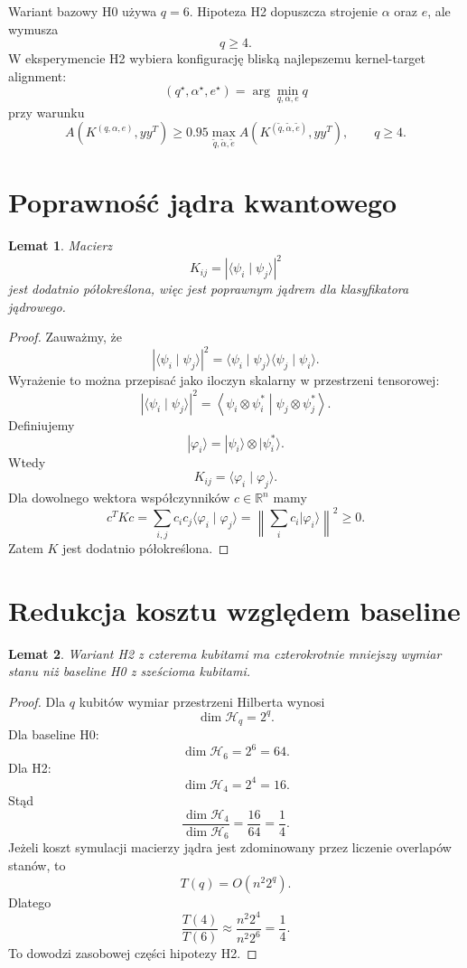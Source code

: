 \documentclass[11pt,a4paper]{article}
\newtheorem{lemma}{Lemat}
\begin{document}
Wariant bazowy H0 używa $q=6$. Hipoteza H2 dopuszcza strojenie $\alpha$ oraz $e$, ale wymusza
\[
q \ge 4.
\]
W eksperymencie H2 wybiera konfigurację bliską najlepszemu kernel-target alignment:
\[
(q^\star,\alpha^\star,e^\star)
=
\arg\min_{q,\alpha,e} q
\]
przy warunku
\[
A\!\left(K^{(q,\alpha,e)}, yy^T\right)
\ge
0.95
\max_{\tilde q,\tilde\alpha,\tilde e}
A\!\left(K^{(\tilde q,\tilde\alpha,\tilde e)}, yy^T\right),
\qquad q\ge 4.
\]

\section{Poprawność jądra kwantowego}

\begin{lemma}
Macierz
\[
K_{ij}=\left|\langle\psi_i\mid\psi_j\rangle\right|^2
\]
jest dodatnio półokreślona, więc jest poprawnym jądrem dla klasyfikatora jądrowego.
\end{lemma}

\begin{proof}
Zauważmy, że
\[
\left|\langle\psi_i\mid\psi_j\rangle\right|^2
=
\langle\psi_i\mid\psi_j\rangle
\langle\psi_j\mid\psi_i\rangle.
\]
Wyrażenie to można przepisać jako iloczyn skalarny w przestrzeni tensorowej:
\[
\left|\langle\psi_i\mid\psi_j\rangle\right|^2
=
\left\langle
\psi_i\otimes\psi_i^\ast
\middle|
\psi_j\otimes\psi_j^\ast
\right\rangle.
\]
Definiujemy
\[
|\varphi_i\rangle = |\psi_i\rangle \otimes |\psi_i^\ast\rangle.
\]
Wtedy
\[
K_{ij}=\langle\varphi_i\mid\varphi_j\rangle.
\]
Dla dowolnego wektora współczynników $c\in\mathbb{R}^n$ mamy
\[
c^T K c
=
\sum_{i,j} c_i c_j \langle\varphi_i\mid\varphi_j\rangle
=
\left\|
\sum_i c_i|\varphi_i\rangle
\right\|^2
\ge 0.
\]
Zatem $K$ jest dodatnio półokreślona.
\end{proof}

\section{Redukcja kosztu względem baseline}

\begin{lemma}
Wariant H2 z czterema kubitami ma czterokrotnie mniejszy wymiar stanu niż baseline H0 z sześcioma kubitami.
\end{lemma}

\begin{proof}
Dla $q$ kubitów wymiar przestrzeni Hilberta wynosi
\[
\dim \mathcal{H}_q = 2^q.
\]
Dla baseline H0:
\[
\dim \mathcal{H}_6 = 2^6 = 64.
\]
Dla H2:
\[
\dim \mathcal{H}_4 = 2^4 = 16.
\]
Stąd
\[
\frac{\dim \mathcal{H}_4}{\dim \mathcal{H}_6}
=
\frac{16}{64}
=
\frac14.
\]
Jeżeli koszt symulacji macierzy jądra jest zdominowany przez liczenie overlapów stanów, to
\[
T(q)=O(n^2 2^q).
\]
Dlatego
\[
\frac{T(4)}{T(6)}
\approx
\frac{n^2 2^4}{n^2 2^6}
=
\frac14.
\]
To dowodzi zasobowej części hipotezy H2.
\end{proof}
\end{document}
